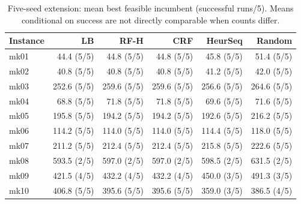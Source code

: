 \begin{table}[htbp]\centering\small
\caption{Five-seed extension: mean best feasible incumbent (successful runs/5). Means conditional on success are not directly comparable when counts differ.}\label{tab:five-seeds}
\begin{tabular}{lrrrrr}\toprule
Instance & LB & RF-H & CRF & HeurSeq & Random \\ \midrule
mk01 & 44.4 (5/5) & 44.8 (5/5) & 44.8 (5/5) & 45.8 (5/5) & 51.4 (5/5) \\
mk02 & 40.8 (5/5) & 40.8 (5/5) & 40.8 (5/5) & 41.2 (5/5) & 42.0 (5/5) \\
mk03 & 252.6 (5/5) & 259.6 (5/5) & 259.6 (5/5) & 256.6 (5/5) & 264.6 (5/5) \\
mk04 & 68.8 (5/5) & 71.8 (5/5) & 71.8 (5/5) & 69.6 (5/5) & 71.6 (5/5) \\
mk05 & 195.8 (5/5) & 194.2 (5/5) & 194.2 (5/5) & 192.6 (5/5) & 216.2 (5/5) \\
mk06 & 114.2 (5/5) & 114.0 (5/5) & 114.0 (5/5) & 114.4 (5/5) & 118.0 (5/5) \\
mk07 & 211.2 (5/5) & 212.4 (5/5) & 212.4 (5/5) & 215.8 (5/5) & 222.6 (5/5) \\
mk08 & 593.5 (2/5) & 597.0 (2/5) & 597.0 (2/5) & 598.5 (2/5) & 631.5 (2/5) \\
mk09 & 421.5 (4/5) & 432.2 (4/5) & 432.2 (4/5) & 450.0 (3/5) & 491.3 (3/5) \\
mk10 & 406.8 (5/5) & 395.6 (5/5) & 395.6 (5/5) & 359.0 (3/5) & 386.5 (4/5) \\
\bottomrule\end{tabular}\end{table}
